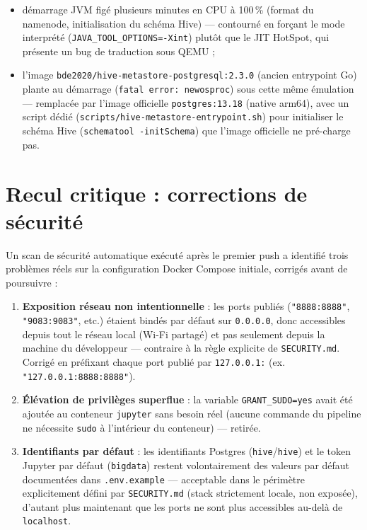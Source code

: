 \begin{itemize}[leftmargin=1.5em]
  \item démarrage JVM figé plusieurs minutes en CPU à 100\,\% (format
    du namenode, initialisation du schéma Hive) — contourné en forçant
    le mode interprété (\texttt{JAVA\_TOOL\_OPTIONS=-Xint}) plutôt que
    le JIT HotSpot, qui présente un bug de traduction sous QEMU ;
  \item l'image \texttt{bde2020/hive-metastore-postgresql:2.3.0}
    (ancien entrypoint Go) plante au démarrage
    (\texttt{fatal error: newosproc}) sous cette même émulation —
    remplacée par l'image officielle \texttt{postgres:13.18} (native
    arm64), avec un script dédié
    (\texttt{scripts/hive-metastore-entrypoint.sh}) pour initialiser le
    schéma Hive (\texttt{schematool -initSchema}) que l'image
    officielle ne pré-charge pas.
\end{itemize}

\section{Recul critique : corrections de sécurité}

Un scan de sécurité automatique exécuté après le premier push a
identifié trois problèmes réels sur la configuration Docker Compose
initiale, corrigés avant de poursuivre :

\begin{enumerate}[leftmargin=1.5em]
  \item \textbf{Exposition réseau non intentionnelle} : les ports
    publiés (\texttt{"8888:8888"}, \texttt{"9083:9083"}, etc.) étaient
    bindés par défaut sur \texttt{0.0.0.0}, donc accessibles depuis tout
    le réseau local (Wi-Fi partagé) et pas seulement depuis la machine
    du développeur — contraire à la règle explicite de
    \texttt{SECURITY.md}. Corrigé en préfixant chaque port publié par
    \texttt{127.0.0.1:} (ex. \texttt{"127.0.0.1:8888:8888"}).
  \item \textbf{Élévation de privilèges superflue} : la variable
    \texttt{GRANT\_SUDO=yes} avait été ajoutée au conteneur
    \texttt{jupyter} sans besoin réel (aucune commande du pipeline ne
    nécessite \texttt{sudo} à l'intérieur du conteneur) — retirée.
  \item \textbf{Identifiants par défaut} : les identifiants Postgres
    (\texttt{hive}/\texttt{hive}) et le token Jupyter par défaut
    (\texttt{bigdata}) restent volontairement des valeurs par défaut
    documentées dans \texttt{.env.example} — acceptable dans le
    périmètre explicitement défini par \texttt{SECURITY.md} (stack
    strictement locale, non exposée), d'autant plus maintenant que les
    ports ne sont plus accessibles au-delà de \texttt{localhost}.
\end{enumerate}

